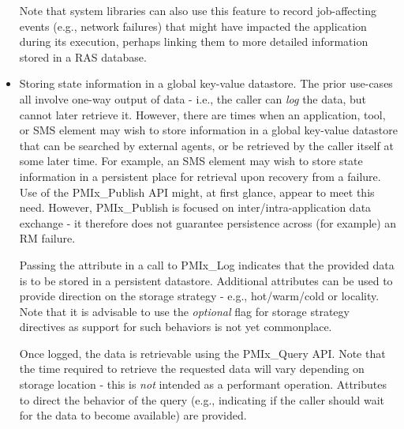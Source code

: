 \begin{itemize}
Note that system libraries can also use this feature to record job-affecting events (e.g., network failures) that might have impacted the application during its execution, perhaps linking them to more detailed information stored in a \ac{RAS} database.

\item Storing state information in a global key-value datastore. The prior use-cases all involve one-way output of data - i.e., the caller can \emph{log} the data, but cannot later retrieve it. However, there are times when an application, tool, or \ac{SMS} element may wish to store information in a global key-value datastore that can be searched by external agents, or be retrieved by the caller itself at some later time. For example, an SMS element may wish to store state information in a persistent place for retrieval upon recovery from a failure. Use of the PMIx_Publish API might, at first glance, appear to meet this need. However, PMIx_Publish is focused on inter/intra-application data exchange - it therefore does not guarantee persistence across (for example) an \ac{RM} failure.

Passing the  attribute in a call to PMIx_Log indicates that the provided data is to be stored in a persistent datastore. Additional attributes can be used to provide direction on the storage strategy - e.g., hot/warm/cold or locality. Note that it is advisable to use the \emph{optional} flag for storage strategy directives as support for such behaviors is not yet commonplace.

Once logged, the data is retrievable using the PMIx_Query API. Note that the time required to retrieve the requested data will vary depending on storage location - this is \emph{not} intended as a performant operation. Attributes to direct the behavior of the query (e.g., indicating if the caller should wait for the data to become available) are provided.
\end{itemize}

